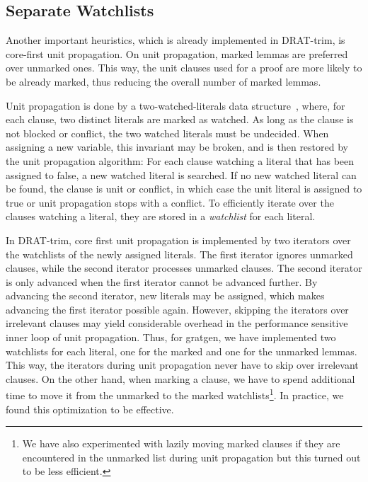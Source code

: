 \documentclass[smallcondensed]{svjour3}     %
\begin{document}
\subsection{Separate Watchlists}
Another important heuristics, which is already implemented in DRAT-trim, is core-first unit propagation.
On unit propagation, marked lemmas are preferred over unmarked ones. This way, the unit clauses used for a proof are more likely to be already marked,
thus reducing the overall number of marked lemmas.

Unit propagation is done by a two-watched-literals data structure~\cite{MMZZ01},
where, for each clause, two distinct literals are marked as watched. As long as the clause is not blocked or conflict, the two watched literals must be undecided.
When assigning a new variable, this invariant may be broken, and is then restored by the unit propagation algorithm: For each clause watching a literal that has been 
assigned to false, a new watched literal is searched. If no new watched literal can be found, the clause is unit or conflict, in which case the unit literal is 
assigned to true or unit propagation stops with a conflict. To efficiently iterate over the clauses watching a literal, they are stored in a \emph{watchlist} for 
each literal.

In DRAT-trim, core first unit propagation is implemented by two iterators over the watchlists of the newly assigned literals.
The first iterator ignores unmarked clauses, while 
the second iterator processes unmarked clauses. The second iterator is only advanced when the first iterator cannot be advanced further. By advancing the second 
iterator, new literals may be assigned, which makes advancing the first iterator possible again.
However, skipping the iterators over irrelevant clauses may yield considerable overhead in the performance sensitive inner loop of unit propagation.
Thus, for gratgen, we have implemented two watchlists for each literal, one for the marked and one for the unmarked lemmas. 
This way, the iterators during unit propagation never have to skip over irrelevant clauses. On the other hand, when marking a clause, we have to spend additional time
to move it from the unmarked to the marked watchlists\footnote{We have also experimented with lazily moving marked clauses if they are encountered in the unmarked list during unit propagation but this turned out to be less efficient.}. In practice, we found this optimization to be effective.
\end{document}
